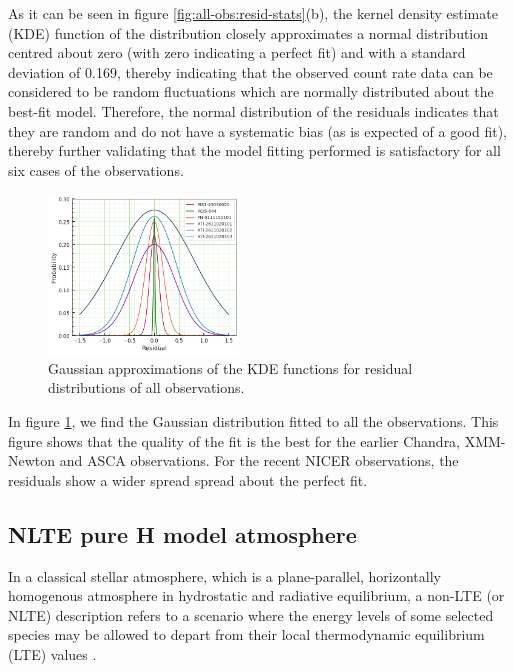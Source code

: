     As it can be seen in figure \ref{fig:all-obs:resid-stats}(b), the kernel density estimate (KDE) function of the distribution closely approximates a normal distribution centred about zero (with zero indicating a perfect fit) and with a standard deviation of 0.169, thereby indicating that the observed count rate data can be considered to be random fluctuations which are normally distributed about the best-fit model. Therefore, the normal distribution of the residuals indicates that they are random and do not have a systematic bias (as is expected of a good fit), thereby further validating that the model fitting performed is satisfactory for all six cases of the observations.
    
    \begin{figure}[!htb]
    	\centering
    	\includegraphics[width=0.45\textwidth]{figures/resid/mr-vel-resid-gaussfit_all-obs.png}
    	\caption{Gaussian approximations of the KDE functions for residual distributions of all observations.}
    	\label{fig:all-obs:resid-gaussfit}
    \end{figure}
    
    In figure \ref{fig:all-obs:resid-gaussfit}, we find the Gaussian distribution fitted to all the observations. This figure shows that the quality of the fit is the best for the earlier Chandra, XMM-Newton and ASCA observations. For the recent NICER observations, the residuals show a wider spread spread about the perfect fit.
    
    
    \subsection{NLTE pure H model atmosphere}
    In a classical stellar atmosphere, which is a plane-parallel, horizontally homogenous atmosphere in hydrostatic and radiative equilibrium, a non-LTE (or NLTE) description refers to a scenario where the energy levels of some selected species may be allowed to depart from their local thermodynamic equilibrium (LTE) values \cite{hubeny2014theory}.
